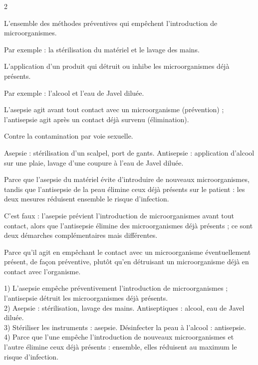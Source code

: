\begin{multicols}{2}

L'ensemble des méthodes préventives qui empêchent l'introduction de microorganismes.

Par exemple : la stérilisation du matériel et le lavage des mains.

L'application d'un produit qui détruit ou inhibe les microorganismes déjà présents.

Par exemple : l'alcool et l'eau de Javel diluée.

L'asepsie agit avant tout contact avec un microorganisme (prévention) ; l'antisepsie
agit après un contact déjà survenu (élimination).

Contre la contamination par voie sexuelle.

Asepsie : stérilisation d'un scalpel, port de gants. Antisepsie : application d'alcool
sur une plaie, lavage d'une coupure à l'eau de Javel diluée.

Parce que l'asepsie du matériel évite d'introduire de nouveaux microorganismes,
tandis que l'antisepsie de la peau élimine ceux déjà présents sur le patient : les
deux mesures réduisent ensemble le risque d'infection.

C'est faux : l'asepsie prévient l'introduction de microorganismes avant tout contact,
alors que l'antisepsie élimine des microorganismes déjà présents ; ce sont deux
démarches complémentaires mais différentes.

Parce qu'il agit en empêchant le contact avec un microorganisme éventuellement
présent, de façon préventive, plutôt qu'en détruisant un microorganisme déjà en
contact avec l'organisme.

1) L'asepsie empêche préventivement l'introduction de microorganismes ; l'antisepsie
détruit les microorganismes déjà présents.\\
2) Asepsie : stérilisation, lavage des mains. Antiseptiques : alcool, eau de Javel
diluée.\\
3) Stériliser les instruments : asepsie. Désinfecter la peau à l'alcool : antisepsie.\\
4) Parce que l'une empêche l'introduction de nouveaux microorganismes et l'autre
élimine ceux déjà présents : ensemble, elles réduisent au maximum le risque
d'infection.

\end{multicols}
\exercicesBanner

